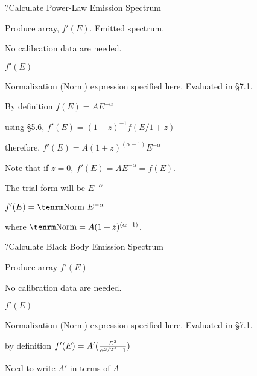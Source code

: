 \??Calculate Power-Law Emission Spectrum

{\listlist


Produce array, $f'(E)$.  Emitted spectrum.


}

{\parindent \vbox{}}

{\listlist

No calibration data are needed.


$f'(E)$

Normalization (Norm) expression specified here.  Evaluated in \S7.1.


By definition $f(E) = AE^{-\alpha}$

using \S5.6, $f'(E) = (1+z)^{-1} f(E/1+z)$

therefore, $f'(E) = A(1+z)^{(\alpha-1)}E^{-\alpha}$

Note that if $z=0,~f'(E) = AE^{-\alpha} = f(E).$

The trial form will be $E^{-\alpha}$

$f'(E) = {\rm Norm}~E^{-\alpha}$

where ${\rm Norm} = A(1+z)^{(\alpha-1)}$.

}

\??Calculate Black Body Emission Spectrum

{\listlist


Produce array $f'(E)$


}

{\parindent \vbox{}}

{\listlist
 
No calibration data are needed.


$f'(E)$

Normalization (Norm) expression specified here. Evaluated in \S7.1.


by definition $f'(E) = A'({E^{3}\over e^{E/T'}-1})$

Need to write $A'$ in terms of $A$

}

